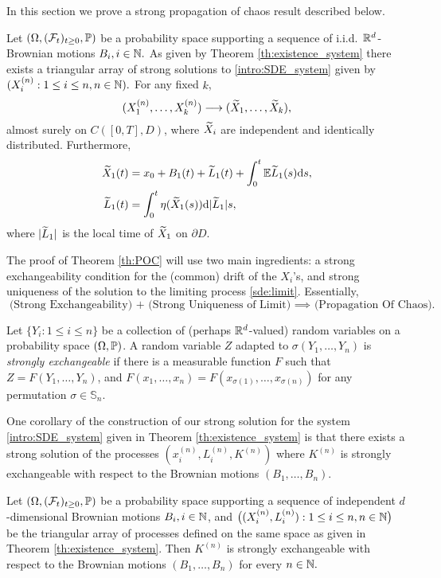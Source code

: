 In this section we prove a strong propagation of chaos result described below.
\begin{theorem}\label{th:POC}
	Let $(\Omega, (\mathcal{F}_t)_{t \geq 0}, \mathbb{P})$ be a probability space supporting a sequence of i.i.d.\ $\mathbb{R}^d$-Brownian motions $B_i, i \in \mathbb{N}.$ As given by Theorem \ref{th:existence_system} there exists a triangular array of strong solutions to \eqref{intro:SDE_system} given by $(X_i^{(n)} : 1 \leq i \leq n, n \in \mathbb{N}).$ For any fixed $k$,
	\[
	(X_1^{(n)}, \dots, X_k^{(n)}) \longrightarrow (\widetilde{X}_1, \dots, \widetilde{X}_k),
	\]
	almost surely on $C([0, T], D)$, where $\widetilde{X}_i$ are independent and identically distributed. Furthermore, 
	\begin{align}\label{sde:limit}
		\begin{split}
			\widetilde{X}_1(t) &= x_0 + B_1(t) + \widetilde{L}_1(t) + \int_0^t\mathbb{E} \widetilde{L}_1(s)\mathrm{d} s,\\
			\widetilde{L}_1(t) &= \int_0^t\eta(\widetilde{X}_1(s)) \mathrm{d}|\widetilde{L}_1| s, 
		\end{split}
	\end{align}
	where $|\widetilde{L}_1|$ is the local time of $\widetilde{X}_1$ on $\partial D.$
\end{theorem}
\noindent
The proof of Theorem \ref{th:POC} will use two main ingredients: a strong exchangeability condition for the (common) drift of the $X_i$'s, and strong uniqueness of the solution to the limiting process \eqref{sde:limit}. Essentially,
\[
\text{(Strong Exchangeability) + (Strong Uniqueness of Limit) $\implies$ (Propagation Of Chaos).}
\]
\begin{definition}
	Let $\{Y_i : 1 \leq i  \leq n\}$ be a collection of (perhaps $\mathbb{R}^d$-valued) random variables on a probability space $(\Omega, \mathbb{P})$. A random variable $Z$ adapted to $\sigma(Y_1,\dots, Y_n)$ is \emph{strongly exchangeable} if
	there is a measurable function $F$ such that $Z = F(Y_1, \dots, Y_n)$, and 
	$F(x_1, \dots, x_n) = F(x_{\sigma(1)}, \dots, x_{\sigma(n)})$ for any permutation $\sigma \in \mathbb{S}_n.$
\end{definition}
\noindent
One corollary of the construction of our strong solution for the system \eqref{intro:SDE_system} given in Theorem \ref{th:existence_system} is that there exists a strong solution of the processes $(x_i^{(n)}, L_i^{(n)}, K^{(n)})$ where
$K^{(n)}$ is strongly exchangeable with respect to the Brownian motions $(B_1, \dots, B_n).$
\begin{corollary}\label{cor:K_exchangeable}
	Let $(\Omega, (\mathcal{F}_t)_{t \geq 0}, \mathbb{P})$ be a probability space supporting a sequence of independent $d$-dimensional Brownian motions $B_i, i \in \mathbb{N}$, and $\big((X_i^{(n)}, L_i^{(n)}) : 1 \leq i \leq n, n \in \mathbb{N}\big)$ be the triangular array of processes defined on the same space as given in Theorem \ref{th:existence_system}. Then $K^{(n)}$ is strongly exchangeable with respect to the Brownian motions $(B_1, \dots, B_n)$ for every $n \in \mathbb{N}.$
\end{corollary}

